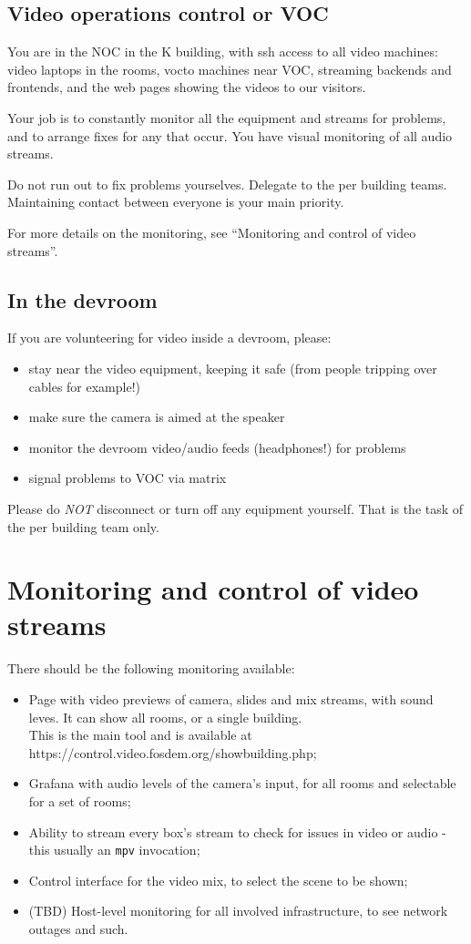 \documentclass{article}
\begin{document}
\subsection{Video operations control or VOC}
You are in the NOC in the K building, with ssh access to all video machines: video laptops in the rooms, vocto machines near VOC, streaming backends and frontends, and the web pages showing the videos to our visitors.

Your job is to constantly monitor all the equipment and streams for problems, and to arrange fixes for any that occur. You have visual monitoring of all audio streams.

Do not run out to fix problems yourselves. Delegate to the per building teams. Maintaining contact between everyone is your main priority.

For more details on the monitoring, see ``Monitoring and control of video streams''.


\subsection{In the devroom}
If you are volunteering for video inside a devroom, please:
\begin{itemize}
  \item stay near the video equipment, keeping it safe (from people tripping over cables for example!)
  \item make sure the camera is aimed at the speaker
  \item monitor the devroom video/audio feeds (headphones!) for problems
  \item signal problems to VOC via matrix
\end{itemize}

Please do \emph{NOT} disconnect or turn off any equipment yourself. That is the task of the per building team only.

\section{Monitoring and control of video streams}

There should be the following monitoring available:

\begin{itemize}
  \item Page with video previews of camera, slides and mix streams, with sound leves. It can show all rooms, or a single building.\\ This is the main tool and is available at https://control.video.fosdem.org/showbuilding.php;
  \item Grafana with audio levels of the camera's input, for all rooms and selectable for a set of rooms;
  \item Ability to stream every box's stream to check for issues in video or audio - this usually an \texttt{mpv} invocation;
  \item Control interface for the video mix, to select the scene to be shown;
  \item (TBD) Host-level monitoring for all involved infrastructure, to see network outages and such.
\end{itemize}
\end{document}
